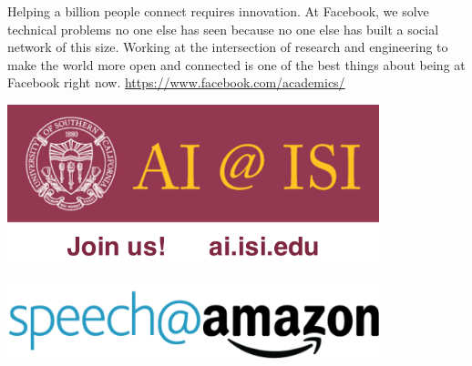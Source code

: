 Helping a billion people connect requires innovation. At Facebook, we
solve technical problems no one else has seen because no one else has
built a social network of this size. Working at the intersection of
research and engineering to make the world more open and connected is
one of the best things about being at Facebook right
now. \url{https://www.facebook.com/academics/}



\vfill

\includegraphics[width=4.25in]{content/ads/silver/ISI-Ad-silver.pdf}

\newpage
\thispagestyle{empty}

\includegraphics[width=4.25in]{content/ads/gold/Amazon.png}

